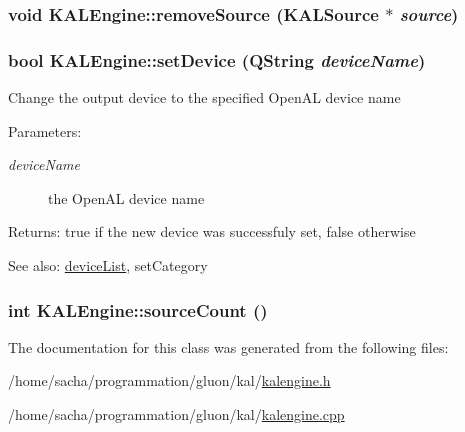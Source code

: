 \hypertarget{class_k_a_l_engine_4399d5d8e66ee8dba068cb9080d244cc}{
\subsubsection[{removeSource}]{\setlength{\rightskip}{0pt plus 5cm}void KALEngine::removeSource ({\bf KALSource} $\ast$ {\em source})}}
\label{class_k_a_l_engine_4399d5d8e66ee8dba068cb9080d244cc}


\hypertarget{class_k_a_l_engine_697ace280196c559fc54f9e4ad99945b}{
\subsubsection[{setDevice}]{\setlength{\rightskip}{0pt plus 5cm}bool KALEngine::setDevice (QString {\em deviceName})}}
\label{class_k_a_l_engine_697ace280196c559fc54f9e4ad99945b}


Change the output device to the specified OpenAL device name \begin{Desc}
\item[Parameters:]
\begin{description}
\item[{\em deviceName}]the OpenAL device name \end{description}
\end{Desc}
\begin{Desc}
\item[Returns:]true if the new device was successfuly set, false otherwise \end{Desc}
\begin{Desc}
\item[See also:]\hyperlink{class_k_a_l_engine_9141fde32ddd7c6e7e9e2a0dc5d5375b}{deviceList}, setCategory \end{Desc}
\hypertarget{class_k_a_l_engine_0f2cee92e67b65ee5af5d6e3db0a1848}{
\subsubsection[{sourceCount}]{\setlength{\rightskip}{0pt plus 5cm}int KALEngine::sourceCount ()}}
\label{class_k_a_l_engine_0f2cee92e67b65ee5af5d6e3db0a1848}




The documentation for this class was generated from the following files:\begin{CompactItemize}
\item 
/home/sacha/programmation/gluon/kal/\hyperlink{kalengine_8h}{kalengine.h}\item 
/home/sacha/programmation/gluon/kal/\hyperlink{kalengine_8cpp}{kalengine.cpp}\end{CompactItemize}
